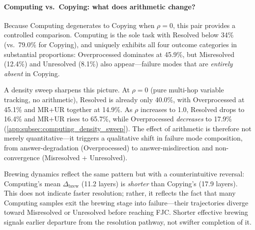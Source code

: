 
\paragraph{Computing vs.\ Copying: what does arithmetic change?}
Because Computing degenerates to Copying when $\rho = 0$, this pair provides a controlled comparison. Computing is the sole task with Resolved below 34\% (vs.\ 79.0\% for Copying), and uniquely exhibits all four outcome categories in substantial proportions: Overprocessed dominates at 45.9\%, but Misresolved (12.4\%) and Unresolved (8.1\%) also appear---failure modes that are \emph{entirely absent} in Copying.

A density sweep sharpens this picture. At $\rho = 0$ (pure multi-hop variable tracking, no arithmetic), Resolved is already only 40.0\%, with Overprocessed at 45.1\% and MR+UR together at 14.9\%. As $\rho$ increases to 1.0, Resolved drops to 16.4\% and MR+UR rises to 65.7\%, while Overprocessed \emph{decreases} to 17.9\% (\cref{app:subsec:computing_density_sweep}). The effect of arithmetic is therefore not merely quantitative---it triggers a qualitative shift in failure mode composition, from answer-degradation (Overprocessed) to answer-misdirection and non-convergence (Misresolved + Unresolved).

Brewing dynamics reflect the same pattern but with a counterintuitive reversal: Computing's mean $\Delta_{\mathrm{brew}}$ (11.2 layers) is \emph{shorter} than Copying's (17.9 layers). This does not indicate faster resolution; rather, it reflects the fact that many Computing samples exit the brewing stage into failure---their trajectories diverge toward Misresolved or Unresolved before reaching FJC. Shorter effective brewing signals earlier departure from the resolution pathway, not swifter completion of it.


